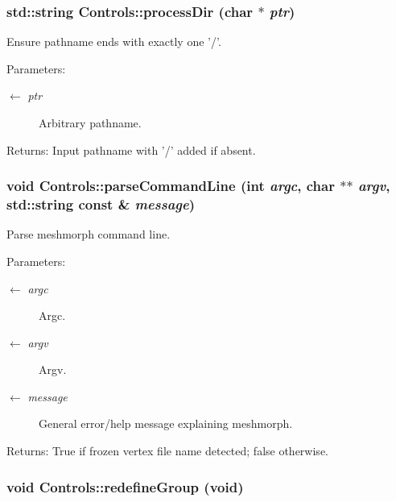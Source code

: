 \subsubsection{\setlength{\rightskip}{0pt plus 5cm}std::string Controls::process\-Dir (char $\ast$ {\em ptr})}\label{classControls_e6979940e4f4bf3ce346e1b349f93f70}


Ensure pathname ends with exactly one '/'. \begin{Desc}
\item[Parameters:]
\begin{description}
\item[\mbox{$\leftarrow$} {\em ptr}]Arbitrary pathname. \end{description}
\end{Desc}
\begin{Desc}
\item[Returns:]Input pathname with '/' added if absent. \end{Desc}
\subsubsection{\setlength{\rightskip}{0pt plus 5cm}void Controls::parse\-Command\-Line (int {\em argc}, char $\ast$$\ast$ {\em argv}, std::string const \& {\em message})}\label{classControls_23c753663e767adbf22f29fced3d565b}


Parse meshmorph command line. \begin{Desc}
\item[Parameters:]
\begin{description}
\item[\mbox{$\leftarrow$} {\em argc}]Argc. \item[\mbox{$\leftarrow$} {\em argv}]Argv. \item[\mbox{$\leftarrow$} {\em message}]General error/help message explaining meshmorph. \end{description}
\end{Desc}
\begin{Desc}
\item[Returns:]True if frozen vertex file name detected; false otherwise. \end{Desc}
\subsubsection{\setlength{\rightskip}{0pt plus 5cm}void Controls::redefine\-Group (void)}\label{classControls_d370653f7b422886c03d9b76a61d9e68}


